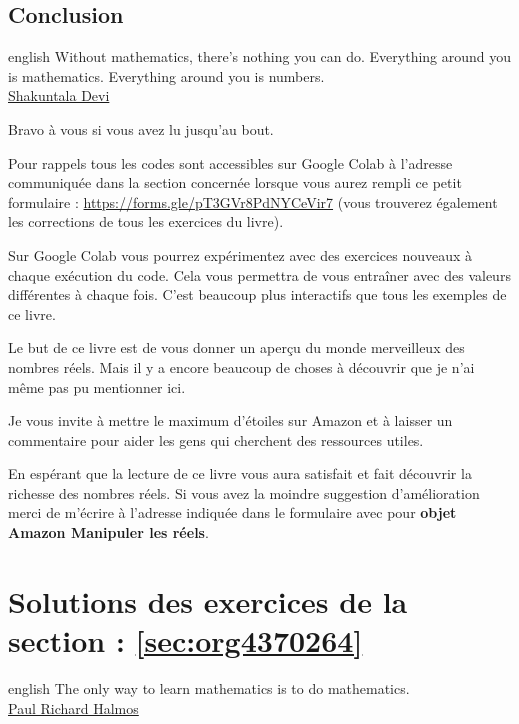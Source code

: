 \documentclass[a4paper, 11pt, twoside]{book}
\begin{document}
\chapter{Conclusion}
\label{sec:org2d74712}
\startcontents[level-2]

\begin{foreigndisplayquote}{english}
Without mathematics, there’s nothing you can do. Everything around
you is mathematics. Everything around you is numbers.\\

\href{https://en.wikipedia.org/wiki/Shakuntala\_Devi}{Shakuntala Devi} 
\end{foreigndisplayquote}

Bravo à vous si vous avez lu jusqu'au bout.

Pour rappels tous les codes sont accessibles sur Google Colab à
l'adresse communiquée dans la section concernée lorsque vous
aurez rempli ce petit formulaire :
\url{https://forms.gle/pT3GVr8PdNYCeVir7} (vous trouverez également
les corrections de tous les exercices du livre).

Sur Google Colab vous pourrez expérimentez avec des exercices
nouveaux à chaque exécution du code. Cela vous permettra de vous
entraîner avec des valeurs différentes à chaque fois. C'est beaucoup
plus interactifs que tous les exemples de ce livre.

Le but de ce livre est de vous donner un aperçu du monde merveilleux
des nombres réels. Mais il y a encore beaucoup de choses à découvrir
que je n'ai même pas pu mentionner ici.

Je vous invite à mettre le maximum d'étoiles sur Amazon et à laisser
un commentaire pour aider les gens qui cherchent des ressources utiles.

En espérant que la lecture de ce livre vous aura satisfait et fait
découvrir la richesse des nombres réels. Si vous avez la moindre
suggestion d'amélioration merci de m'écrire à l'adresse
indiquée dans le formulaire avec pour \textbf{objet Amazon Manipuler les réels}.
\stopcontents[level-2]
\stopcontents[level-1]

\part{Solutions des exercices de la section : \ref{sec:org4370264}}
\label{sec:orga610f4f}
\startcontents[level-1]
\begin{foreigndisplayquote}{english}
The only way to learn mathematics is to do mathematics.\\

\href{https://en.wikipedia.org/wiki/Paul\_Halmos}{Paul Richard Halmos}
\end{foreigndisplayquote}
\end{document}
